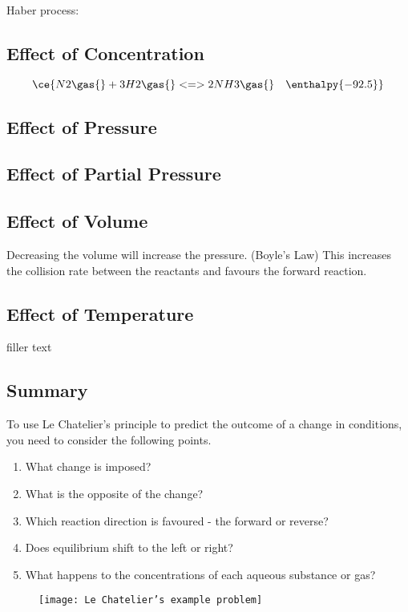 	Haber process:

	\subsection{Effect of Concentration}
		\begin{equation}
			\ce{N2\gas{} + 3H2\gas{} <=> 2NH3\gas{} \quad \enthalpy{-92.5}}
		\end{equation}
		

	\subsection{Effect of Pressure}
	\subsection{Effect of Partial Pressure}
	\subsection{Effect of Volume}
		Decreasing the volume will increase the pressure. (Boyle's Law) This increases the collision rate between the reactants and favours the forward reaction.

	\subsection{Effect of Temperature}
		filler text
	
	\subsection{Summary}
		To use Le Chatelier's principle to predict the outcome of a change in conditions, you need to consider the following points.
		\begin{enumerate}
			\item What change is imposed?
			\item What is the opposite of the change?
			\item Which reaction direction is favoured - the forward or reverse?
			\item Does equilibrium shift to the left or right?
			\item What happens to the concentrations of each aqueous substance or gas?
		\end{enumerate}

	\begin{figure}[H]
		\centering
		\texttt{[image: Le Chatelier's example problem]}
	\end{figure}

